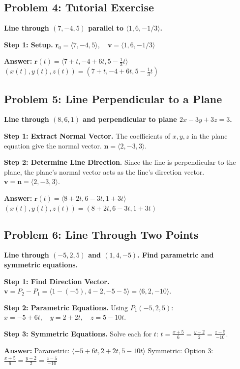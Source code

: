 \documentclass[11pt]{article}
\begin{document}
\hrulefill

\subsection*{Problem 4: Tutorial Exercise}
\textbf{Line through $(7, -4, 5)$ parallel to $\langle 1, 6, -1/3 \rangle$.}

\textbf{Step 1: Setup.}
$\mathbf{r}_0 = \langle 7, -4, 5 \rangle, \quad \mathbf{v} = \langle 1, 6, -1/3 \rangle$

\textbf{Answer:}
$\mathbf{r}(t) = \langle 7+t, -4+6t, 5 - \frac{1}{3}t \rangle$
$(x(t), y(t), z(t)) = (7+t, -4+6t, 5 - \frac{1}{3}t)$

\hrulefill

\subsection*{Problem 5: Line Perpendicular to a Plane}
\textbf{Line through $(8, 6, 1)$ and perpendicular to plane $2x - 3y + 3z = 3$.}

\textbf{Step 1: Extract Normal Vector.}
The coefficients of $x, y, z$ in the plane equation give the normal vector.
$\mathbf{n} = \langle 2, -3, 3 \rangle$.

\textbf{Step 2: Determine Line Direction.}
Since the line is perpendicular to the plane, the plane's normal vector acts as the line's direction vector.
$\mathbf{v} = \mathbf{n} = \langle 2, -3, 3 \rangle$.

\textbf{Answer:}
$\mathbf{r}(t) = \langle 8+2t, 6-3t, 1+3t \rangle$
$(x(t), y(t), z(t)) = (8+2t, 6-3t, 1+3t)$

\hrulefill

\subsection*{Problem 6: Line Through Two Points}
\textbf{Line through $(-5, 2, 5)$ and $(1, 4, -5)$. Find parametric and symmetric equations.}

\textbf{Step 1: Find Direction Vector.}
$\mathbf{v} = P_2 - P_1 = \langle 1 - (-5), 4 - 2, -5 - 5 \rangle = \langle 6, 2, -10 \rangle$.

\textbf{Step 2: Parametric Equations.}
Using $P_1(-5, 2, 5)$:
$x = -5 + 6t, \quad y = 2 + 2t, \quad z = 5 - 10t$.

\textbf{Step 3: Symmetric Equations.}
Solve each for $t$:
$t = \frac{x+5}{6} = \frac{y-2}{2} = \frac{z-5}{-10}$.

\textbf{Answer:}
Parametric: $\langle -5+6t, 2+2t, 5-10t \rangle$
Symmetric: Option 3: $\frac{x+5}{6} = \frac{y-2}{2} = \frac{z-5}{-10}$
\end{document}

